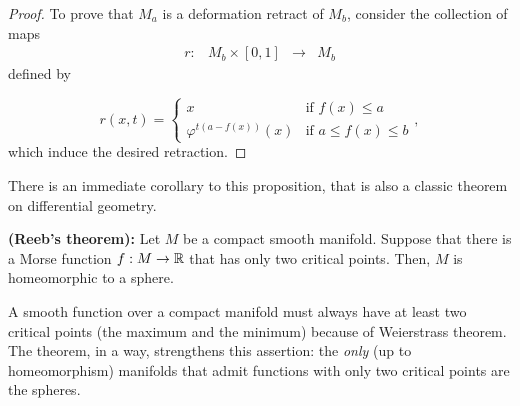 \begin{proof}
To prove that $M_a$ is a deformation retract of $M_b$, consider the collection of maps
\[\begin{array}{rccc} r : & M_b \times [0,1] & \longrightarrow & M_b \end{array}\]
defined by

\[r(x,t) = \left\{ \begin{array}{ll} x & \text{if } f(x) \leq a \\ \varphi^{t(a-f(x))}(x) & \text{if } a \leq f(x) \leq b \end{array} \right. ,\]
which induce the desired retraction.
\end{proof}

There is an immediate corollary to this proposition, that is also a classic theorem on differential geometry.

\begin{coro} {\bf (Reeb's theorem):} Let $M$ be a compact smooth manifold. Suppose that there is a Morse function $f : M \rightarrow \mathbb{R}$ that has only two critical points. Then, $M$ is homeomorphic to a sphere.\end{coro}

\begin{rmrk} A smooth function over a compact manifold must always have at least two critical points (the maximum and the minimum) because of Weierstrass theorem. The theorem, in a way, strengthens this assertion: the {\it only} (up to homeomorphism) manifolds that admit functions with only two critical points are the spheres.
\end{rmrk}

